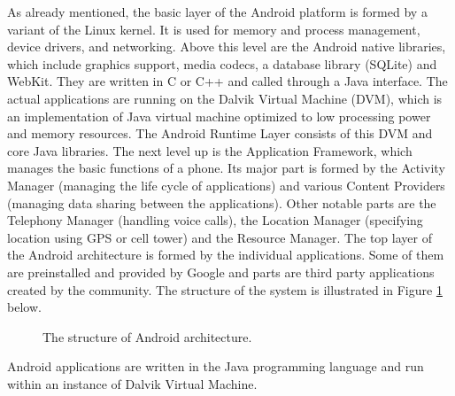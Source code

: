 As already mentioned, the basic layer of the Android platform is formed by a variant of the Linux kernel. 
It is used for memory and process management, device drivers, and networking.
Above this level are the Android native libraries, which include graphics support, media codecs, a database library (SQLite) and WebKit.
They are written in C or C++ and called through a Java interface.
The actual applications are running on the Dalvik Virtual Machine (DVM), which is an implementation of Java virtual machine optimized to low processing power and memory resources.
The Android Runtime Layer consists of this DVM and core Java libraries. 
The next level up is the Application Framework, which manages the basic functions of a phone. 
Its major part is formed by the Activity Manager (managing the life cycle of applications) and various Content Providers (managing data sharing between the applications).
Other notable parts are the Telephony Manager (handling voice calls), the Location Manager (specifying location using GPS or cell tower) and the Resource Manager.
The top layer of the Android architecture is formed by the individual applications.
Some of them are preinstalled and provided by Google and parts are third party applications created by the community.
The structure of the system is illustrated in Figure \ref{fig:architecture} below. 
\begin{figure}[h!]
    \label{fig:architecture}
    \caption{The structure of Android architecture.}
\end{figure}
Android applications are written in the Java programming language and run within an instance of Dalvik Virtual Machine.
